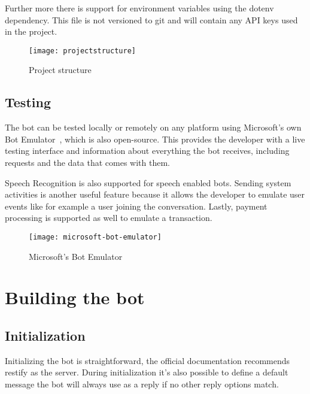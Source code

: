 Further more there is support for environment variables using the dotenv dependency. This file is not versioned to git and will contain any API keys used in the project.

\begin{figure}[ht]
	\centering
	\texttt{[image: projectstructure]}\label{fig:projectstructure}
	\caption{Project structure}
\end{figure}

\subsection{Testing}

The bot can be tested locally or remotely on any platform using Microsoft's own Bot Emulator~\cite{microsoft-bot-emulator}, which is also open-source. This provides the developer with a live testing interface and information about everything the bot receives, including requests and the data that comes with them.

Speech Recognition is also supported for speech enabled bots. Sending system activities is another useful feature because it allows the developer to emulate user events like for example a user joining the conversation. Lastly, payment processing is supported as well to emulate a transaction.

\begin{figure}[!hb]
	\centering
	\texttt{[image: microsoft-bot-emulator]}\label{fig:microsoft-bot-emulator}
	\caption{Microsoft's Bot Emulator~\cite{microsoft-bot-emulator}}
\end{figure}

\section{Building the bot}

\subsection{Initialization}

Initializing the bot is straightforward, the official documentation recommends restify as the server. During initialization it's also possible to define a default message the bot will always use as a reply if no other reply options match.

